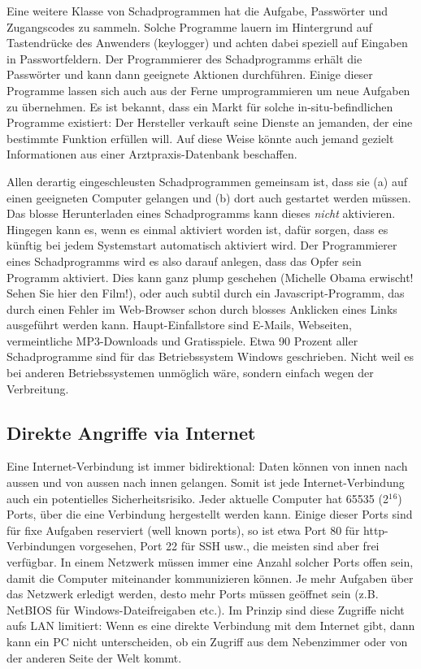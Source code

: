 \documentclass[a4paper]{scrartcl}
\begin{document}
\medskip

Eine weitere Klasse von Schadprogrammen hat die Aufgabe, Passwörter und Zugangscodes zu sammeln. Solche Programme lauern im Hintergrund auf Tastendrücke des Anwenders (keylogger) und achten dabei speziell auf Eingaben in Passwortfeldern. Der Programmierer des Schadprogramms erhält die Passwörter und kann dann geeignete Aktionen durchführen. Einige dieser Programme lassen sich auch aus der Ferne umprogrammieren um neue Aufgaben zu übernehmen. Es ist bekannt, dass ein Markt für solche in-situ-befindlichen Programme existiert: Der Hersteller verkauft seine Dienste an jemanden, der eine bestimmte Funktion erfüllen will. Auf diese Weise könnte auch jemand gezielt Informationen aus einer Arztpraxis-Datenbank beschaffen.

\medskip

Allen derartig eingeschleusten Schadprogrammen gemeinsam ist, dass sie (a) auf einen geeigneten Computer gelangen und (b) dort auch gestartet werden müssen. Das blosse Herunterladen eines Schadprogramms kann dieses \textit{nicht} aktivieren. Hingegen kann es, wenn es einmal aktiviert worden ist, dafür sorgen, dass es künftig bei jedem Systemstart automatisch aktiviert wird. Der Programmierer eines Schadprogramms wird es also darauf anlegen, dass das Opfer sein Programm aktiviert. Dies kann ganz plump geschehen (\glqq Michelle Obama erwischt! Sehen Sie hier den Film!\grqq{}), oder auch subtil durch ein Javascript-Programm, das durch einen Fehler im Web-Browser schon durch blosses Anklicken eines Links ausgeführt werden kann. Haupt-Einfallstore sind E-Mails, Webseiten, vermeintliche MP3-Downloads und Gratisspiele. Etwa 90 Prozent aller Schadprogramme sind für das Betriebssystem Windows geschrieben. Nicht weil es bei anderen Betriebssystemen unmöglich wäre, sondern einfach wegen der Verbreitung.


\subsection{Direkte Angriffe via Internet}
Eine Internet-Verbindung ist immer bidirektional: Daten können von innen nach aussen und von aussen nach innen gelangen. Somit ist jede Internet-Verbindung auch ein potentielles Sicherheitsrisiko. Jeder aktuelle Computer hat 65535 (2$^1$$^6$) Ports, über die eine Verbindung hergestellt werden kann. Einige dieser Ports sind für fixe Aufgaben reserviert (well known ports), so ist etwa Port 80 für http-Verbindungen vorgesehen, Port 22 für SSH usw., die meisten sind aber frei verfügbar. In einem Netzwerk müssen immer eine Anzahl solcher Ports offen sein, damit die Computer miteinander kommunizieren können. Je mehr Aufgaben über das Netzwerk erledigt werden, desto mehr Ports müssen geöffnet sein (z.B. NetBIOS für Windows-Dateifreigaben etc.). Im Prinzip sind diese Zugriffe nicht aufs LAN limitiert: Wenn es eine direkte Verbindung mit dem Internet gibt, dann kann ein PC nicht unterscheiden, ob ein Zugriff aus dem Nebenzimmer oder von der anderen Seite der Welt kommt.
\end{document}
